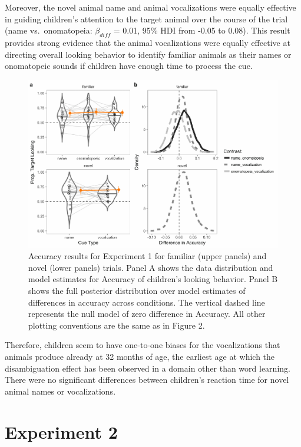 \documentclass[english,floatsintext,man]{apa6}
\theoremstyle{definition}
\theoremstyle{definition}
\theoremstyle{definition}
\theoremstyle{remark}
\begin{document}
Moreover, the novel animal name and animal vocalizations were equally
effective in guiding children's attention to the target animal over the
course of the trial (name vs.~onomatopeia: \(\beta_{diff}\) = 0.01, 95\%
HDI from -0.05 to 0.08). This result provides strong evidence that the
animal vocalizations were equally effective at directing overall looking
behavior to identify familiar animals as their names or onomatopeic
sounds if children have enough time to process the cue.

\begin{figure}[tb]
\includegraphics[width=0.95\linewidth]{anime_manuscript_files/figure-latex/acc-plot-e1-1} \caption{Accuracy results for Experiment 1 for familiar (upper panels) and novel (lower panels) trials. Panel A shows the data distribution and model estimates for Accuracy of children's looking behavior. Panel B shows the full posterior distribution over model estimates of differences in accuracy across conditions. The vertical dashed line represents the null model of zero difference in Accuracy. All other plotting conventions are the same as in Figure 2.}\label{fig:acc-plot-e1}
\end{figure}

Therefore, children seem to have one-to-one biases for the vocalizations
that animals produce already at 32 months of age, the earliest age at
which the disambiguation effect has been observed in a domain other than
word learning. There were no significant differences between children's
reaction time for novel animal names or vocalizations.

\hypertarget{experiment-2}{%
\section{Experiment 2}\label{experiment-2}}
\end{document}
